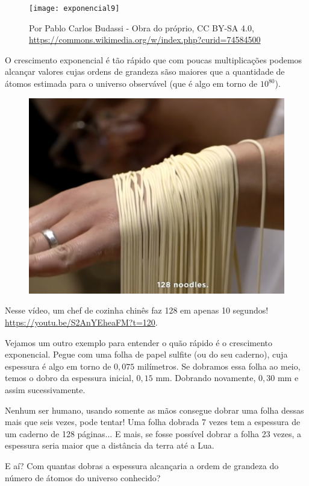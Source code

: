 \begin{knowledge}

\begin{figure}[H]
\centering
\texttt{[image: exponencial9]}

\caption*{Por Pablo Carlos Budassi - Obra do próprio, CC BY-SA 4.0, \url{https://commons.wikimedia.org/w/index.php?curid=74584500}}
\end{figure}

O crescimento exponencial é tão rápido que com poucas multiplicações podemos alcançar valores cujas ordens de grandeza sãso maiores que a quantidade de átomos estimada para o universo observável (que é algo em torno de $10^80$).

\begin{figure}

\includegraphics[width=.4\textwidth]{Figuras/exponencial10.png}

\end{figure}

Nesse vídeo, um chef de cozinha chinês faz 128 em apenas 10 segundos! \url{https://youtu.be/S2AnYEheaFM?t=120}.

Vejamos um outro exemplo para entender o quão rápido é o crescimento exponencial. Pegue com uma folha de papel sulfite (ou do seu caderno), cuja espessura é algo em torno de $0,075$ milímetros. Se dobramos essa folha ao meio, temos o dobro da espessura inicial, $0,15$ mm. Dobrando novamente, $0,30$ mm e assim sucessivamente.

Nenhum ser humano, usando somente as mãos consegue dobrar uma folha dessas mais que seis vezes, pode tentar! Uma folha dobrada 7 vezes tem a espessura de um caderno de 128 páginas... E mais, se fosse possível dobrar a folha 23 vezes, a espessura seria maior que a distância da terra até a Lua.

E aí? Com quantas dobras a espessura alcançaria a ordem de grandeza do número de átomos do universo conhecido?
\end{knowledge}

